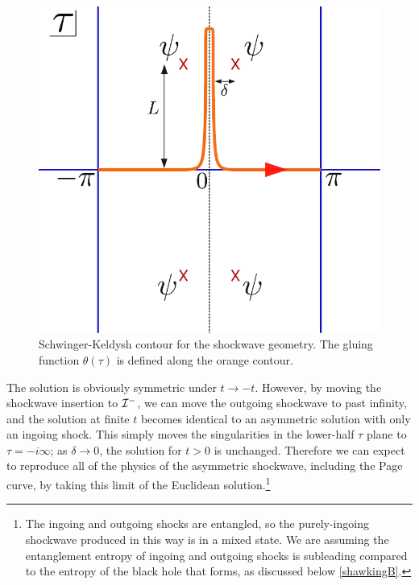 \documentclass[11pt,oneside,letterpaper]{article}
\numberwithin{equation}{section}
\begin{document}
\begin{spacing}{1.1}
\begin{figure}[th]
\begin{center}
\includegraphics[scale=0.65]{figures/skcontour_background.pdf}
\end{center}
\caption{Schwinger-Keldysh contour for the shockwave geometry. The gluing function $\theta(\tau)$ is defined along the orange contour. \label{fig:SKbackground}}
\end{figure}

The solution is obviously symmetric under $t \to -t$. However, by moving the shockwave insertion to ${\cal I}^-$, we can move the outgoing shockwave to past infinity, and the solution at finite $t$ becomes identical to an asymmetric solution with only an ingoing shock.  This simply moves the singularities in the lower-half $\tau$ plane to $\tau = -i\infty$; as $\delta \to 0$, the solution for $t>0$ is unchanged. Therefore we can expect to reproduce all of the physics of the asymmetric shockwave, including the Page curve, by taking this limit of the Euclidean solution.\footnote{The ingoing and outgoing shocks are entangled, so the purely-ingoing shockwave produced in this way is in a mixed state. We are assuming the entanglement entropy of ingoing and outgoing shocks is subleading compared to the entropy of the black hole that forms, as discussed below \eqref{shawkingB}.}




\end{spacing}
\end{document}
